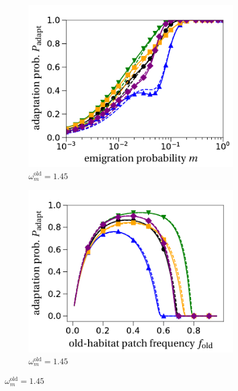 \documentclass[11pt]{article}
\begin{document}
\begin{figure}[t!]
\begin{subfigure}{.5\textwidth}
 		 \centering
 		 \includegraphics[width=\linewidth]{fig3c.pdf}
  		\caption{$\omega^\text{old}_m=1.45$ }
  		\label{fig:source_sink_m-45}
	\end{subfigure}%
	\begin{subfigure}{.5\textwidth}
  		\centering
  		\includegraphics[width=\linewidth]{fig3d.pdf}
  		\caption{$\omega^\text{old}_m=1.45$}
  		\label{fig:source_sink_f-45}
	\end{subfigure}

\end{figure}
\end{document}
